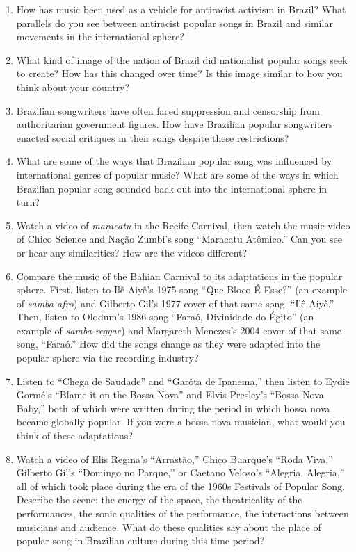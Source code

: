 \documentclass[twoside]{article}
\begin{document}
\begin{enumerate}
\def\labelenumi{\arabic{enumi}.}
\item
  How has music been used as a vehicle for antiracist activism in
  Brazil? What parallels do you see between antiracist popular songs in
  Brazil and similar movements in the international sphere?
\item
  What kind of image of the nation of Brazil did nationalist popular
  songs seek to create? How has this changed over time? Is this image
  similar to how you think about your country?
\item
  Brazilian songwriters have often faced suppression and censorship from
  authoritarian government figures. How have Brazilian popular
  songwriters enacted social critiques in their songs despite these
  restrictions?
\item
  What are some of the ways that Brazilian popular song was influenced
  by international genres of popular music? What are some of the ways in
  which Brazilian popular song sounded back out into the international
  sphere in turn?
\item
  Watch a video of \emph{maracatu} in the Recife Carnival, then watch
  the music video of Chico Science and Nação Zumbi's song ``Maracatu
  Atômico.'' Can you see or hear any similarities? How are the videos
  different?
\item
  Compare the music of the Bahian Carnival to its adaptations in the
  popular sphere. First, listen to Ilê Aiyê's 1975 song ``Que Bloco É
  Esse?'' (an example of \emph{samba-afro}) and Gilberto Gil's 1977
  cover of that same song, ``Ilê Aiyê.'' Then, listen to Olodum's 1986
  song ``Faraó, Divinidade do Égito'' (an example of
  \emph{samba-reggae}) and Margareth Menezes's 2004 cover of that same
  song, ``Faraó.'' How did the songs change as they were adapted into
  the popular sphere via the recording industry?
\item
  Listen to ``Chega de Saudade'' and ``Garôta de Ipanema,'' then listen
  to Eydie Gormé's ``Blame it on the Bossa Nova'' and Elvis Presley's
  ``Bossa Nova Baby,'' both of which were written during the period in
  which bossa nova became globally popular. If you were a bossa nova
  musician, what would you think of these adaptations?
\item
  Watch a video of Elis Regina's ``Arrastão,'' Chico Buarque's ``Roda
  Viva,'' Gilberto Gil's ``Domingo no Parque,'' or Caetano Veloso's
  ``Alegria, Alegria,'' all of which took place during the era of the
  1960s Festivals of Popular Song. Describe the scene: the energy of the
  space, the theatricality of the performances, the sonic qualities of
  the performance, the interactions between musicians and audience. What
  do these qualities say about the place of popular song in Brazilian
  culture during this time period?
\end{enumerate}
\end{document}
